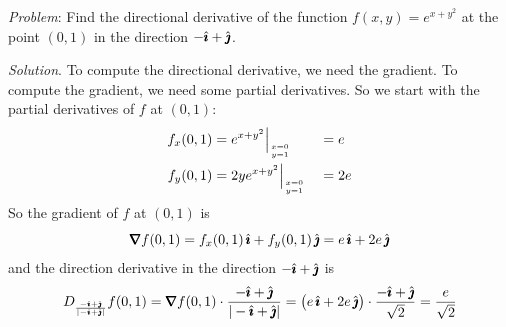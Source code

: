 \begin{eg}\label{eg dir deriv A}
\noindent\textit{Problem}:
Find the directional derivative of the function $f(x,y)=e^{x+y^2}$
at the point $(0,1)$ in the direction $-\hat{\pmb{\imath}} + \hat{\pmb{\jmath}}$.

\medskip
\noindent\textit{Solution}. 
To compute the directional derivative, we need the gradient.
To compute the gradient, we need some partial derivatives.
So we start with the partial derivatives of $f$ at $(0,1)$:
\begin{alignat*}{3}
f_x(0,1) &= e^{x+y^2}\Big|_{x=0\atop y=1} &&=e \\
f_y(0,1) &= 2ye^{x+y^2}\Big|_{x=0\atop y=1} &&=2e 
\end{alignat*}
So the gradient of $f$ at $(0,1)$ is
\begin{equation*}
\vnabla f(0,1) = f_x(0,1)\,\hi + f_y(0,1)\,\hj 
               = e\,\hi + 2e\,\hj
\end{equation*}
and the direction derivative in the direction $-\hat{\pmb{\imath}} + \hat{\pmb{\jmath}}$ is
\begin{equation*}
D_{\frac{-\hi+\hj}{|-\hi+\hj|}} f(0,1) 
   = \vnabla f(0,1)\cdot\frac{-\hi+\hj}{|-\hi+\hj|}
   = \big(e\,\hi + 2e\,\hj\big)\cdot \frac{-\hi+\hj}{\sqrt{2}}
   = \frac{e}{\sqrt{2}}
\end{equation*}

\end{eg}


